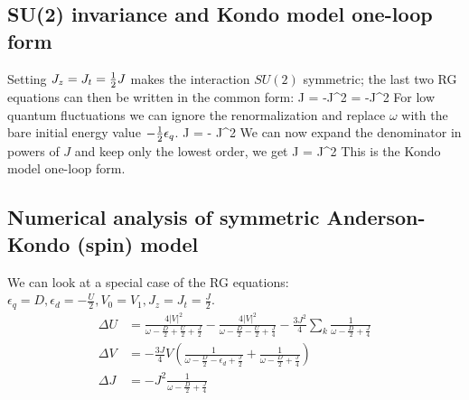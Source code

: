 \documentclass[12pt,twoside]{article}
\numberwithin{equation}{section}
\begin{document}
\subsection{SU(2) invariance and Kondo model one-loop form}
Setting \(J_z = J_t = \frac{1}{2} J\) makes the interaction \(SU(2)\) symmetric; the last two RG equations can then be written in the common form:
\beq
\Delta J = -J^2 = -J^2
\eeq
For low quantum fluctuations we can ignore the renormalization and replace \(\omega\) with the bare initial energy value \(-\frac{1}{2}\epsilon_q\).
\beq
\Delta J = - J^2 
\eeq
We can now expand the denominator in powers of \(J\) and keep only the lowest order, we get
\beq
\Delta J = J^2 
\eeq
This is the Kondo model one-loop form.
\subsection{Numerical analysis of symmetric Anderson-Kondo (spin) model}
We can look at a special case of the RG equations: \(\epsilon_q = D, \epsilon_d = -\frac{U}{2}, V_0 = V_1, J_z = J_t = \frac{J}{2}\).
\begin{equation}\begin{aligned}
	\Delta U &= \frac{4|V|^2}{\omega - \frac{D}{2} + \frac{U}{2} + \frac{J}{2}} - \frac{4|V|^2}{\omega - \frac{D}{2} - \frac{U}{2} + \frac{J}{4}} - \frac{3J^2}{4}\sum_k \frac{1}{\omega - \frac{D}{2} + \frac{J}{4}}\\
	\Delta V &= -\frac{3J}{4}V\left(\frac{1}{\omega - \frac{D}{2} - \epsilon_d + \frac{J}{2}} + \frac{1}{\omega - \frac{D}{2} + \frac{J}{4}}\right)\\
	\Delta J &= -J^2\frac{1}{\omega - \frac{D}{2} + \frac{J}{4}}\\
\end{aligned}\end{equation}
\end{document}
